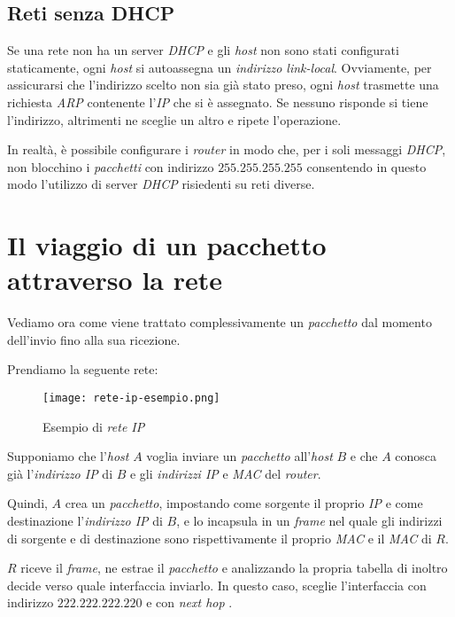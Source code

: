 \subsection{Reti senza DHCP}
Se una rete non ha un server \emph{DHCP} e gli \emph{host} non sono stati configurati
staticamente\footnotemark, ogni \emph{host} si autoassegna un \emph{indirizzo
link-local}. Ovviamente, per assicurarsi che l'indirizzo scelto non sia già stato
preso, ogni \emph{host} trasmette una richiesta \emph{ARP} contenente l'\emph{IP}
che si è assegnato. Se nessuno risponde si tiene l'indirizzo, altrimenti ne sceglie
un altro e ripete l'operazione.

In realtà, è possibile configurare i \emph{router} in modo che, per i soli
messaggi \emph{DHCP}, non blocchino i \emph{pacchetti} con indirizzo
$255.255.255.255$ consentendo in questo modo l'utilizzo di server \emph{DHCP}
risiedenti su reti diverse.


\section{Il viaggio di un pacchetto attraverso la rete}
Vediamo ora come viene trattato complessivamente un \emph{pacchetto} dal momento
dell'invio fino alla sua ricezione.

Prendiamo la seguente rete:

\begin{figure}[h!]
    \centering
    \texttt{[image: rete-ip-esempio.png]}
    \caption{Esempio di \emph{rete IP}}
\end{figure}\noindent
Supponiamo che l'\emph{host} $A$ voglia inviare un \emph{pacchetto} all'\emph{host}
$B$ e che $A$ conosca già l'\emph{indirizzo IP} di $B$ e gli \emph{indirizzi IP}
e \emph{MAC} del \emph{router}\footnotemark.


Quindi, $A$ crea un \emph{pacchetto}, impostando come sorgente il proprio \emph{IP}
e come destinazione l'\emph{indirizzo IP} di $B$, e lo incapsula in un
\emph{frame} nel quale gli indirizzi di sorgente e di destinazione sono
rispettivamente il proprio \emph{MAC} e il \emph{MAC} di $R$.

$R$ riceve il \emph{frame}, ne estrae il \emph{pacchetto} e analizzando la
propria tabella di inoltro decide verso quale interfaccia inviarlo. In questo
caso, sceglie l'interfaccia con indirizzo $222.222.222.220$ e con
\emph{next hop} .

